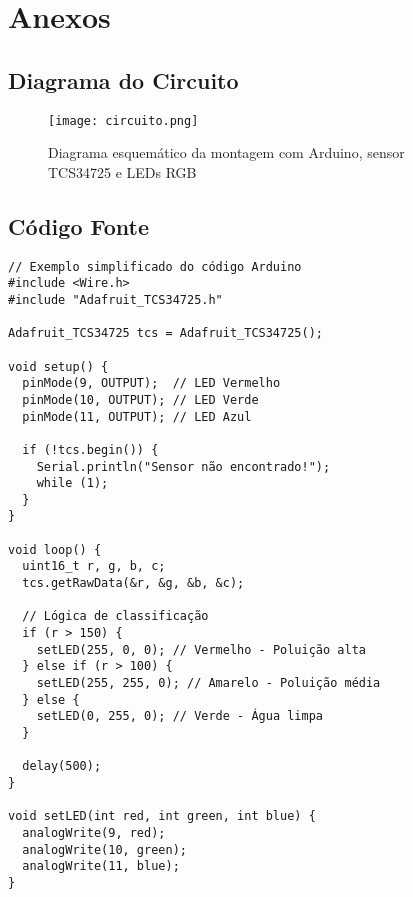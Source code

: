 \documentclass[12pt]{article}
\begin{document}
\section*{Anexos}
\subsection*{Diagrama do Circuito}
\begin{figure}[h]
\centering
\texttt{[image: circuito.png]}
\caption{Diagrama esquemático da montagem com Arduino, sensor TCS34725 e LEDs RGB}
\end{figure}

\subsection*{Código Fonte}
\begin{verbatim}
// Exemplo simplificado do código Arduino
#include <Wire.h>
#include "Adafruit_TCS34725.h"

Adafruit_TCS34725 tcs = Adafruit_TCS34725();

void setup() {
  pinMode(9, OUTPUT);  // LED Vermelho
  pinMode(10, OUTPUT); // LED Verde
  pinMode(11, OUTPUT); // LED Azul
  
  if (!tcs.begin()) {
    Serial.println("Sensor não encontrado!");
    while (1);
  }
}

void loop() {
  uint16_t r, g, b, c;
  tcs.getRawData(&r, &g, &b, &c);
  
  // Lógica de classificação
  if (r > 150) {
    setLED(255, 0, 0); // Vermelho - Poluição alta
  } else if (r > 100) {
    setLED(255, 255, 0); // Amarelo - Poluição média
  } else {
    setLED(0, 255, 0); // Verde - Água limpa
  }
  
  delay(500);
}

void setLED(int red, int green, int blue) {
  analogWrite(9, red);
  analogWrite(10, green);
  analogWrite(11, blue);
}
\end{verbatim}
\end{document}
